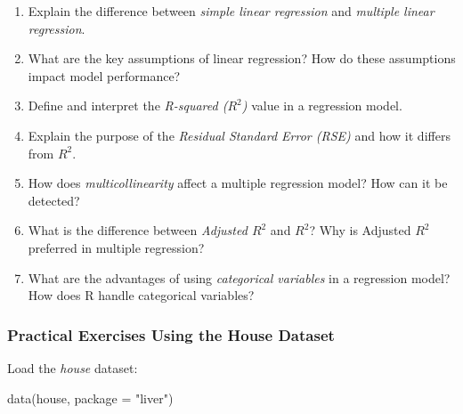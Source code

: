 \documentclass[
  11pt,
]{book}
\makeatletter
\newenvironment{Shaded}{}{}
\newcommand{\AttributeTok}[1]{#1}
\newcommand{\FunctionTok}[1]{#1}
\newcommand{\NormalTok}[1]{#1}
\newcommand{\StringTok}[1]{\textcolor[rgb]{0.39,0.39,0.39}{#1}}
\providecommand{\tightlist}{%
  \setlength{\itemsep}{0pt}\setlength{\parskip}{0pt}}
\newenvironment{kframe}{%
\medskip{}
\setlength{\fboxsep}{.8em}
 \def\at@end@of@kframe{}%
 \ifinner\ifhmode%
  \def\at@end@of@kframe{\end{minipage}}%
  \begin{minipage}{\columnwidth}%
 \fi\fi%
 \def\FrameCommand##1{\hskip\@totalleftmargin \hskip-\fboxsep
 \colorbox{shadecolor}{##1}\hskip-\fboxsep
     \hskip-\linewidth \hskip-\@totalleftmargin \hskip\columnwidth}%
 \MakeFramed {\advance\hsize-\width
   \@totalleftmargin\z@ \linewidth\hsize
   \@setminipage}}%
 {\par\unskip\endMakeFramed%
 \at@end@of@kframe}
\renewenvironment{Shaded}{\begin{kframe}}{\end{kframe}}
\theoremstyle{definition}
\theoremstyle{definition}
\theoremstyle{definition}
\theoremstyle{definition}
\theoremstyle{remark}
\makeatother
\begin{document}
\begin{enumerate}
\def\labelenumi{\arabic{enumi}.}
\tightlist
\item
  Explain the difference between \emph{simple linear regression} and \emph{multiple linear regression}.\\
\item
  What are the key assumptions of linear regression? How do these assumptions impact model performance?\\
\item
  Define and interpret the \emph{R-squared (\(R^2\))} value in a regression model.\\
\item
  Explain the purpose of the \emph{Residual Standard Error (RSE)} and how it differs from \(R^2\).\\
\item
  How does \emph{multicollinearity} affect a multiple regression model? How can it be detected?\\
\item
  What is the difference between \emph{Adjusted \(R^2\)} and \emph{\(R^2\)}? Why is Adjusted \(R^2\) preferred in multiple regression?
\item
  What are the advantages of using \emph{categorical variables} in a regression model? How does R handle categorical variables?
\end{enumerate}

\subsubsection*{Practical Exercises Using the House Dataset}\label{practical-exercises-using-the-house-dataset}


Load the \emph{house} dataset:

\begin{Shaded}
\begin{Highlighting}[]
\FunctionTok{data}\NormalTok{(house, }\AttributeTok{package =} \StringTok{"liver"}\NormalTok{)}
\end{Highlighting}
\end{Shaded}
\end{document}
